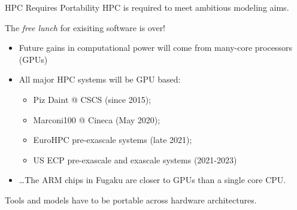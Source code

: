 \documentclass[aspectratio=43]{beamer}
\begin{document}
\begin{frame}[fragile]{HPC Requires Portability}
    HPC is required to meet ambitious modeling aims.

    The \emph{free lunch} for exisiting software is over!
    \begin{itemize}
        \item Future gains in computational power will come from many-core processors (GPUs)
        \item All major HPC systems will be GPU based:
        \begin{itemize}
            \item Piz Daint @ CSCS (since 2015);
            \item Marconi100 @ Cineca (May 2020);
            \item EuroHPC pre-exascale systems (late 2021);
            \item US ECP pre-exascale and exascale systems (2021-2023)
        \end{itemize}
        \item \dots The ARM chips in Fugaku are closer to GPUs than a single core CPU.
    \end{itemize}
    Tools and models have to be portable across hardware architectures.
\end{frame}
\end{document}
